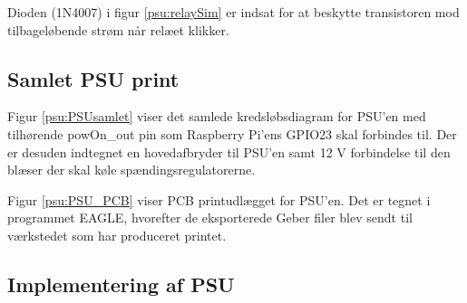 Dioden (1N4007) i figur \ref{psu:relaySim} er indsat for at beskytte transistoren mod tilbageløbende strøm når relæet klikker. 


\subsection{Samlet PSU print}


Figur \ref{psu:PSUsamlet} viser det samlede kredsløbsdiagram for PSU'en med tilhørende powOn\_out pin som Raspberry Pi'ens GPIO23 skal forbindes til. Der er desuden indtegnet en hovedafbryder til PSU'en samt 12 V forbindelse til den blæser der skal køle spændingsregulatorerne.

Figur \ref{psu:PSU_PCB} viser PCB printudlægget for PSU'en. Det er tegnet i programmet EAGLE, hvorefter de eksporterede Geber filer blev sendt til værkstedet som har produceret printet. 


\subsection{Implementering af PSU}


